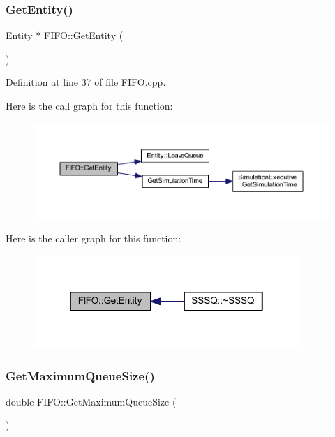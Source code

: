 \subsubsection{\texorpdfstring{Get\+Entity()}{GetEntity()}}
{\footnotesize\ttfamily \hyperlink{class_entity}{Entity} $\ast$ F\+I\+F\+O\+::\+Get\+Entity (\begin{DoxyParamCaption}{ }\end{DoxyParamCaption})}



Definition at line 37 of file F\+I\+F\+O.\+cpp.

Here is the call graph for this function\+:\nopagebreak
\begin{figure}[H]
\begin{center}
\leavevmode
\includegraphics[width=350pt]{class_f_i_f_o_a428f7532d582435ee5710641f0f87bfd_cgraph}
\end{center}
\end{figure}
Here is the caller graph for this function\+:\nopagebreak
\begin{figure}[H]
\begin{center}
\leavevmode
\includegraphics[width=286pt]{class_f_i_f_o_a428f7532d582435ee5710641f0f87bfd_icgraph}
\end{center}
\end{figure}
\mbox{\label{class_f_i_f_o_a77a83086bafa4145487dd2918ed36aa4}} 
\subsubsection{\texorpdfstring{Get\+Maximum\+Queue\+Size()}{GetMaximumQueueSize()}}
{\footnotesize\ttfamily double F\+I\+F\+O\+::\+Get\+Maximum\+Queue\+Size (\begin{DoxyParamCaption}{ }\end{DoxyParamCaption})}



